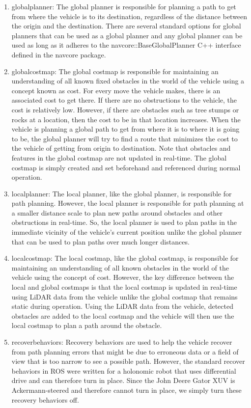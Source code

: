 \begin{enumerate}
\item global\textunderscore planner: The global planner is responsible for planning a path to get from where the vehicle is to its destination, regardless of the distance between the origin and the destination. There are several standard options for global planners that can be used as a global planner and any global planner can be used as long as it adheres to the nav\textunderscore core::BaseGlobalPlanner C++ interface defined in the nav\textunderscore core package.
\item global\textunderscore costmap: The global costmap is responsible for maintaining an understanding of all known fixed obstacles in the world of the vehicle using a concept known as cost. For every move the vehicle makes, there is an associated cost to get there. If there are no obstructions to the vehicle, the cost is relatively low. However, if there are obstacles such as tree stumps or rocks at a location, then the cost to be in that location increases. When the vehicle is planning a global path to get from where it is to where it is going to be, the global planner will try to find a route that minimizes the cost to the vehicle of getting from origin to destination. Note that obstacles and features in the global costmap are not updated in real-time. The global costmap is simply created and set beforehand and referenced during normal operation. 
\item local\textunderscore planner: The local planner, like the global planner, is responsible for path planning. However, the local planner is responsible for path planning at a smaller distance scale to plan new paths around obstacles and other obstructions in real-time. So, the local planner is used to plan paths in the immediate vicinity of the vehicle's current position unlike the global planner that can be used to plan paths over much longer distances. 
\item local\textunderscore costmap: The local costmap, like the global costmap, is responsible for maintaining an understanding of all known obstacles in the world of the vehicle using the concept of cost. However, the key difference between the local and global costmaps is that the local costmap is updated in real-time using LiDAR data from the vehicle unlike the global costmap that remains static during operation. Using the LiDAR data from the vehicle, detected obstacles are added to the local costmap and the vehicle will then use the local costmap to plan a path around the obstacle.
\item recover\textunderscore behaviors: Recovery behaviors are used to help the vehicle recover from path planning errors that might be due to erroneous data or a field of view that is too narrow to see a possible path. However, the standard recover behaviors in ROS were written for a holonomic robot that uses differential drive and can therefore turn in place. Since the John Deere Gator XUV is Ackermann-steered and therefore cannot turn in place, we simply turn these recovery behaviors off.
\end{enumerate}

